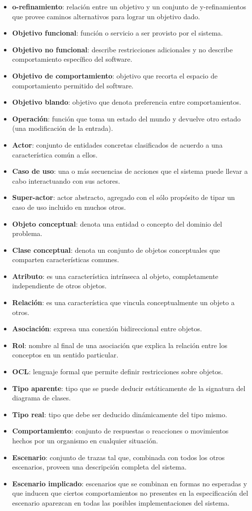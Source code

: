 \documentclass[]{article}
\begin{document}
\begin{itemize}
	\item \textbf{o-refinamiento}: relación entre un objetivo y un conjunto de y-refinamientos que provee caminos alternativos para lograr un objetivo dado.
	\item \textbf{Objetivo funcional}: función o servicio a ser provisto por el sistema.
	\item \textbf{Objetivo no funcional}: describe restricciones adicionales y no describe comportamiento específico del software.
	\item \textbf{Objetivo de comportamiento}: objetivo que recorta el espacio de comportamiento permitido del software.
	\item \textbf{Objetivo blando}: objetivo que denota preferencia entre comportamientos.
	\item \textbf{Operación}: función que toma un estado del mundo y devuelve otro estado (una modificación de la entrada).
	\item \textbf{Actor}: conjunto de entidades concretas clasificados de acuerdo a una característica común a ellos.
	\item \textbf{Caso de uso}: una o más secuencias de acciones que el sistema puede llevar a cabo interactuando con sus actores.
	\item \textbf{Super-actor}: actor abstracto, agregado con el sólo propósito de tipar un caso de uso incluido en muchos otros.
	\item \textbf{Objeto conceptual}: denota una entidad o concepto del dominio del problema.
	\item \textbf{Clase conceptual}: denota un conjunto de objetos conceptuales que comparten características comunes.
	\item \textbf{Atributo}: es una característica intrínseca al objeto, completamente independiente de otros objetos.
	\item \textbf{Relación}: es una característica que vincula conceptualmente un objeto a otros.
	\item \textbf{Asociación}: expresa una conexión bidireccional entre objetos.
	\item \textbf{Rol}: nombre al final de una asociación que explica la relación entre los conceptos en un sentido particular.
	\item \textbf{OCL}: lenguaje formal que permite definir restricciones sobre objetos.
	\item \textbf{Tipo aparente}: tipo que se puede deducir estáticamente de la signatura del diagrama de clases.
	\item \textbf{Tipo real}: tipo que debe ser deducido dinámicamente del tipo mismo.
	\item \textbf{Comportamiento}: conjunto de respuestas o reacciones o movimientos hechos por un organismo en cualquier situación.
	\item \textbf{Escenario}: conjunto de trazas tal que, combinada con todos los otros escenarios, proveen una descripción completa del sistema.
	\item \textbf{Escenario implicado}: escenarios que se combinan en formas no esperadas y que inducen que ciertos comportamientos no presentes en la especificación del escenario aparezcan en todas las posibles implementaciones del sistema.


\end{itemize}
\end{document}
